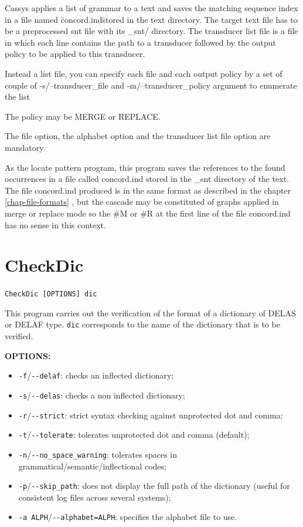 \bigskip
\noindent Cassys applies a list of grammar to a text and saves the matching sequence index in a file named \"concord.ind\" stored in the text directory.
      The target text file has to be a preprocessed snt file with its \_snt/ directory. 
      The transducer list file is a file in which each line contains the path to a transducer followed by the output policy to be applied to this transducer.

\bigskip
\noindent Instead a list file, you can specify each file and each output policy by a set of couple of -s/--transducer\_file 
      and -m/--transducer\_policy argument to enumerate the list
      
\bigskip
\noindent The policy may be MERGE or REPLACE.
      
\bigskip
\noindent The file option, the alphabet option and the transducer list file option are mandatory
     
\bigskip
\noindent As the locate pattern program, this program saves the references to the found occurrences in a file called concord.ind stored 
		in the \_snt directory of the text.
		The file concord.ind produced is in the same format as described in the chapter \ref{chap-file-formats} , but the cascade may be constituted of graphs 
applied in merge or replace mode so the \#M or \#R at the first line of the file concord.ind has no sense in this context.



\section{CheckDic}
\verb+CheckDic [OPTIONS] dic+

\bigskip
\noindent This program carries out the verification of the format of a dictionary
of DELAS or DELAF type. \verb+dic+ corresponds to the name
of the dictionary that is to be verified. 

\bigskip
\noindent \textbf{OPTIONS:}
\begin{itemize}
  \item \verb+-f+/\verb+--delaf+: checks an inflected dictionary;
  \item \verb+-s+/\verb+--delas+: checks a non inflected dictionary;
  \item \verb+-r+/\verb+--strict+: strict syntax checking against unprotected dot and comma;
  \item \verb+-t+/\verb+--tolerate+: tolerates unprotected dot and comma (default);
  \item \verb+-n+/\verb+--no_space_warning+: tolerates spaces in
  grammatical/semantic/inflectional codes;
  \item \verb+-p+/\verb+--skip_path+: does not display the full path of the dictionary (useful 
  for consistent log files across several systems);
  \item \verb+-a ALPH+/\verb+--alphabet=ALPH+: specifies the alphabet file to
        use. 
        
\end{itemize}

